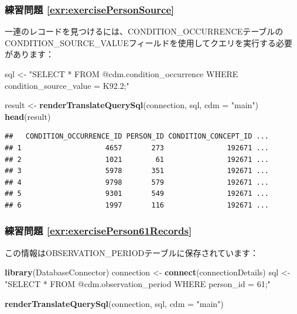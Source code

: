 \documentclass[
  11pt]{book}
\newenvironment{Shaded}{\begin{snugshade}}{\end{snugshade}}
\newcommand{\AttributeTok}[1]{\textcolor[rgb]{0.13,0.29,0.53}{#1}}
\newcommand{\FunctionTok}[1]{\textcolor[rgb]{0.13,0.29,0.53}{\textbf{#1}}}
\newcommand{\NormalTok}[1]{#1}
\newcommand{\OtherTok}[1]{\textcolor[rgb]{0.56,0.35,0.01}{#1}}
\newcommand{\StringTok}[1]{\textcolor[rgb]{0.31,0.60,0.02}{#1}}
\theoremstyle{definition}
\theoremstyle{definition}
\theoremstyle{definition}
\theoremstyle{definition}
\theoremstyle{remark}
\begin{document}
\subsubsection*{練習問題 \ref{exr:exercisePersonSource}}\label{ux7df4ux7fd2ux554fux984c-refexrexercisepersonsource}

一連のレコードを見つけるには、CONDITION\_OCCURRENCEテーブルのCONDITION\_SOURCE\_VALUEフィールドを使用してクエリを実行する必要があります：

\begin{Shaded}
\begin{Highlighting}[]
\NormalTok{sql }\OtherTok{\textless{}{-}} \StringTok{"SELECT *}
\StringTok{FROM @cdm.condition\_occurrence}
\StringTok{WHERE condition\_source\_value = \textquotesingle{}K92.2\textquotesingle{};"}

\NormalTok{result }\OtherTok{\textless{}{-}} \FunctionTok{renderTranslateQuerySql}\NormalTok{(connection, sql, }\AttributeTok{cdm =} \StringTok{"main"}\NormalTok{)}
\FunctionTok{head}\NormalTok{(result)}
\end{Highlighting}
\end{Shaded}

\begin{verbatim}
##   CONDITION_OCCURRENCE_ID PERSON_ID CONDITION_CONCEPT_ID ...
## 1                    4657       273               192671 ...
## 2                    1021        61               192671 ...
## 3                    5978       351               192671 ...
## 4                    9798       579               192671 ...
## 5                    9301       549               192671 ...
## 6                    1997       116               192671 ...
\end{verbatim}

\subsubsection*{練習問題 \ref{exr:exercisePerson61Records}}\label{ux7df4ux7fd2ux554fux984c-refexrexerciseperson61records}

この情報はOBSERVATION\_PERIODテーブルに保存されています：

\begin{Shaded}
\begin{Highlighting}[]
\FunctionTok{library}\NormalTok{(DatabaseConnector)}
\NormalTok{connection }\OtherTok{\textless{}{-}} \FunctionTok{connect}\NormalTok{(connectionDetails)}
\NormalTok{sql }\OtherTok{\textless{}{-}} \StringTok{"SELECT *}
\StringTok{FROM @cdm.observation\_period}
\StringTok{WHERE person\_id = 61;"}

\FunctionTok{renderTranslateQuerySql}\NormalTok{(connection, sql, }\AttributeTok{cdm =} \StringTok{"main"}\NormalTok{)}
\end{Highlighting}
\end{Shaded}
\end{document}
